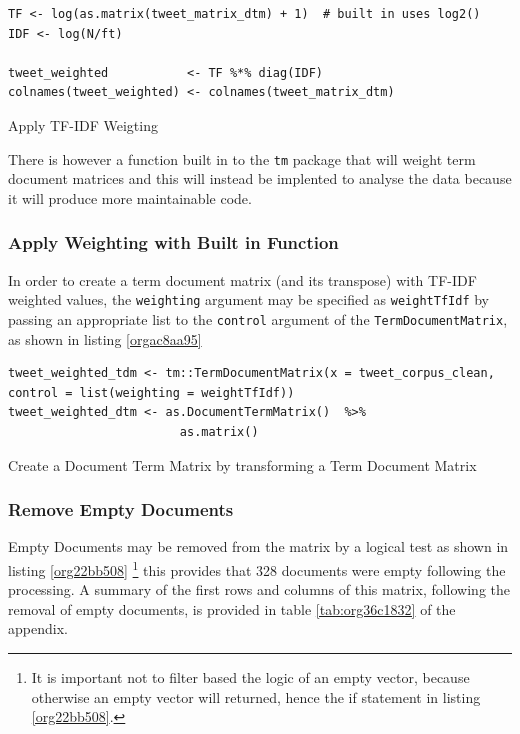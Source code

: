 \documentclass[11pt]{article}
\begin{document}
\begin{enumerate}
\begin{listing}[htbp]
\begin{verbatim}
TF <- log(as.matrix(tweet_matrix_dtm) + 1)  # built in uses log2()
IDF <- log(N/ft)

tweet_weighted           <- TF %*% diag(IDF)
colnames(tweet_weighted) <- colnames(tweet_matrix_dtm)
\end{verbatim}
\caption{\label{org2044579}Apply TF-IDF Weigting}
\end{listing}

There is however a function built in to the \texttt{tm} package that will weight term document matrices and this will instead be implented to analyse the data because it will produce more maintainable code.
\end{enumerate}

\subsubsection{Apply Weighting with Built in Function}
\label{sec:org3724640}
In order to create a term document matrix (and its transpose) with TF-IDF weighted values, the \texttt{weighting} argument may be specified as \texttt{weightTfIdf} by passing an appropriate list to the \texttt{control} argument of the \texttt{TermDocumentMatrix}, as shown in listing \ref{orgac8aa95}

\begin{listing}[htbp]
\begin{verbatim}
tweet_weighted_tdm <- tm::TermDocumentMatrix(x = tweet_corpus_clean, control = list(weighting = weightTfIdf))
tweet_weighted_dtm <- as.DocumentTermMatrix()  %>%
                        as.matrix()
\end{verbatim}
\caption{\label{orgac8aa95}Create a Document Term Matrix by transforming a Term Document Matrix}
\end{listing}

\subsubsection{Remove Empty Documents}
\label{sec:org6721f66}
Empty Documents may be removed from the matrix by a logical test as shown in listing  \ref{org22bb508} \footnote{It is important not to filter based the logic of an empty vector, because
otherwise an empty vector will returned, hence the if statement in listing \ref{org22bb508}.} this provides that 328 documents were empty following the processing. A summary of the first rows and columns of this matrix, following the removal of empty documents, is provided in table \ref{tab:org36c1832} of the appendix.
\end{document}
